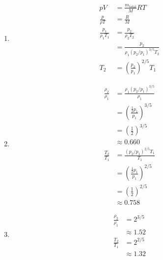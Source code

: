 \documentclass{article}
\begin{document}
\begin{enumerate}
  \item

        \begin{align*}
          p V                    & = \frac{m_\text{total}}{M} R T               \\
          \frac{p}{\rho T}       & = \frac{R}{M}                                \\
          \frac{p_1}{\rho_1 T_1} & = \frac{p_2}{\rho_2 T_2}                     \\
                                 & = \frac{p_2}{\rho_1 (p_2 / p_1)^{3 / 5} T_2} \\
          T_2                    & = \left( \frac{p_2}{p_1} \right)^{2 / 5} T_1
        \end{align*}

  \item

        \begin{align*}
          \frac{\rho_2}{\rho_1} & = \frac{\rho_1 (p_2 / p_1)^{3 / 5}}{\rho_1}          \\
                                & = \left( \frac{\frac{1}{2} p_1}{p_1} \right)^{3 / 5} \\
                                & = \left( \frac{1}{2} \right)^{3 / 5}                 \\
                                & \approx 0.660                                        \\
          \frac{T_2}{T_1}       & = \frac{(p_2 / p_1)^{2 / 5} T_1}{T_1}                \\
                                & = \left( \frac{\frac{1}{2} p_1}{p_1} \right)^{2 / 5} \\
                                & = \left( \frac{1}{2} \right)^{2 / 5}                 \\
                                & \approx 0.758
        \end{align*}

  \item

        \begin{align*}
          \frac{\rho_2}{\rho_1} & = 2^{3 / 5}  \\
                                & \approx 1.52 \\
          \frac{T_2}{T_1}       & = 2^{2 / 5}  \\
                                & \approx 1.32
        \end{align*}
\end{enumerate}
\end{document}
